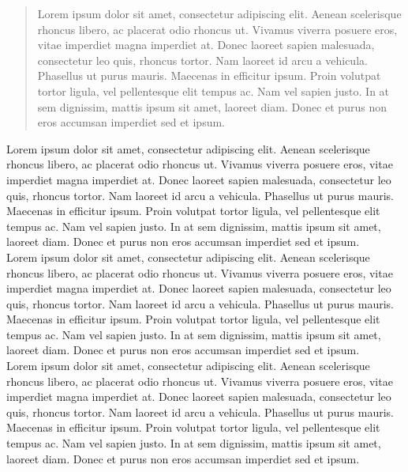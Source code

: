 \begin{abstract}
    Lorem ipsum dolor sit amet, consectetur adipiscing elit. Aenean scelerisque rhoncus libero, ac placerat odio rhoncus ut. Vivamus viverra posuere eros, vitae imperdiet magna imperdiet at. Donec laoreet sapien malesuada, consectetur leo quis, rhoncus tortor. Nam laoreet id arcu a vehicula. Phasellus ut purus mauris. Maecenas in efficitur ipsum. Proin volutpat tortor ligula, vel pellentesque elit tempus ac. Nam vel sapien justo. In at sem dignissim, mattis ipsum sit amet, laoreet diam. Donec et purus non eros accumsan imperdiet sed et ipsum.
\end{abstract}


Lorem ipsum dolor sit amet, consectetur adipiscing elit. Aenean scelerisque rhoncus libero, ac placerat odio rhoncus ut. Vivamus viverra posuere eros, vitae imperdiet magna imperdiet at. Donec laoreet sapien malesuada, consectetur leo quis, rhoncus tortor. Nam laoreet id arcu a vehicula. Phasellus ut purus mauris. Maecenas in efficitur ipsum. Proin volutpat tortor ligula, vel pellentesque elit tempus ac. Nam vel sapien justo. In at sem dignissim, mattis ipsum sit amet, laoreet diam. Donec et purus non eros accumsan imperdiet sed et ipsum.
\\

Lorem ipsum dolor sit amet, consectetur adipiscing elit. Aenean scelerisque rhoncus libero, ac placerat odio rhoncus ut. Vivamus viverra posuere eros, vitae imperdiet magna imperdiet at. Donec laoreet sapien malesuada, consectetur leo quis, rhoncus tortor. Nam laoreet id arcu a vehicula. Phasellus ut purus mauris. Maecenas in efficitur ipsum. Proin volutpat tortor ligula, vel pellentesque elit tempus ac. Nam vel sapien justo. In at sem dignissim, mattis ipsum sit amet, laoreet diam. Donec et purus non eros accumsan imperdiet sed et ipsum.
\\

Lorem ipsum dolor sit amet, consectetur adipiscing elit. Aenean scelerisque rhoncus libero, ac placerat odio rhoncus ut. Vivamus viverra posuere eros, vitae imperdiet magna imperdiet at. Donec laoreet sapien malesuada, consectetur leo quis, rhoncus tortor. Nam laoreet id arcu a vehicula. Phasellus ut purus mauris. Maecenas in efficitur ipsum. Proin volutpat tortor ligula, vel pellentesque elit tempus ac. Nam vel sapien justo. In at sem dignissim, mattis ipsum sit amet, laoreet diam. Donec et purus non eros accumsan imperdiet sed et ipsum.
\\